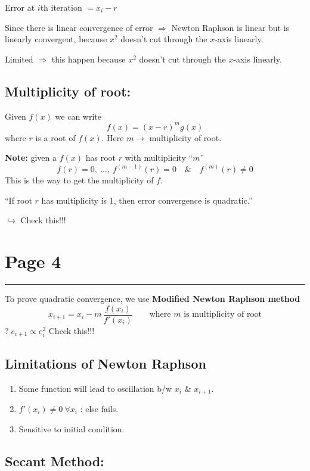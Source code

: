 \documentclass[11pt,a4paper]{article}
\newcommand{\pagehead}[1]{%
  \clearpage
  \section*{Page #1}
  \vspace{-0.6em}
  {\color{black!45}\rule{\linewidth}{0.5pt}}
  \vspace{0.4em}
}
\newcommand{\circled}[1]{\textcircled{\scriptsize #1}}
\begin{document}
Error at $i$th iteration $=x_i-r$

Since there is linear convergence of error $\Rightarrow$ Newton Raphson is
linear but is linearly convergent, because $x^2$ doesn't cut through the
$x$-axis linearly.

Limited $\Rightarrow$ this happen because $x^2$ doesn't cut through the
$x$-axis linearly.

\subsection*{Multiplicity of root:}

Given $f(x)$ we can write
\[
f(x)=(x-r)^m g(x)
\]
where $r$ is a root of $f(x)$. Here $m\to$ multiplicity of root.

\textbf{Note:} given a $f(x)$ has root $r$ with multiplicity ``$m$''
\[
f(r)=0,\ \dots,\ f^{(m-1)}(r)=0 \quad\&\quad f^{(m)}(r)\neq 0
\]
This is the way to get the multiplicity of $f$.

\begin{handbox}
``If root $r$ has multiplicity is 1, then error convergence is quadratic.''
\end{handbox}
$\hookrightarrow$ Check this!!!

\pagehead{4}

To prove quadratic convergence, we use \textbf{Modified Newton Raphson method}
\[
x_{i+1}=x_i-m\,\frac{f(x_i)}{f'(x_i)}
\qquad\text{where }m\text{ is multiplicity of root}
\]
\circled{?}\quad $e_{i+1}\propto e_i^2$ \quad Check this!!!

\subsection*{Limitations of Newton Raphson}

\begin{enumerate}[label=(\arabic*)]
\item Some function will lead to oscillation b/w $x_i$ \& $x_{i+1}$.
\item $f'(x_i)\neq 0\ \forall x_i$ : else fails.
\item Sensitive to initial condition.
\end{enumerate}

\subsection*{Secant Method:}
\end{document}
